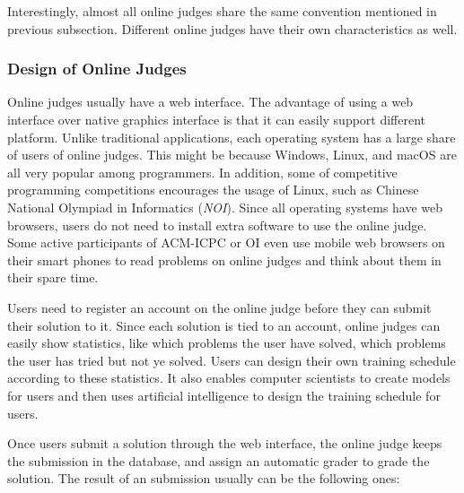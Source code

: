         Interestingly, almost all online judges share the same convention mentioned in previous subsection.
        Different online judges have their own characteristics as well.

        \subsubsection{Design of Online Judges}

            Online judges usually have a web interface.
            The advantage of using a web interface over native graphics interface is that
            it can easily support different platform.
            Unlike traditional applications, each operating system has a large share of users of online judges.
            This might be because Windows, Linux, and macOS are all very popular among programmers.
            In addition, some of competitive programming competitions encourages the usage of Linux,
            such as Chinese National Olympiad in Informatics (\emph{NOI}).  %
            Since all operating systems have web browsers,
            users do not need to install extra software to use the online judge.
            Some active participants of ACM-ICPC or OI even use mobile web browsers on their smart phones
            to read problems on online judges and think about them in their spare time.

            Users need to register an account on the online judge before they can submit their solution to it.
            Since each solution is tied to an account, online judges can easily show statistics,
            like which problems the user have solved, which problems the user has tried but not ye solved.
            Users can design their own training schedule according to these statistics.
            It also enables computer scientists to create models for users and
            then uses artificial intelligence to design the training schedule for users.

            Once users submit a solution through the web interface,
            the online judge keeps the submission in the database,
            and assign an automatic grader to grade the solution.
            The result of an submission usually can be the following ones:

